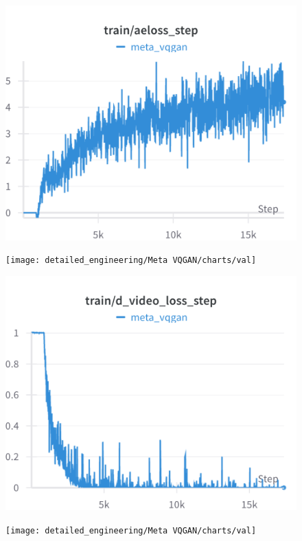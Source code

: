 \begin{figure}[H]
\includegraphics[width=\linewidth]{detailed_engineering/Meta VQGAN/charts/train_aeloss_step.png}
\caption{}
\endminipage\hfill
{}
\texttt{[image: detailed\_engineering/Meta VQGAN/charts/val]}
\caption{}
\endminipage
\end{figure}

\begin{figure}[H]
\includegraphics[width=\linewidth]{detailed_engineering/Meta VQGAN/charts/train_d_video_loss_step.png}
\caption{}
\endminipage\hfill
{}
\texttt{[image: detailed\_engineering/Meta VQGAN/charts/val]}
\caption{}
\endminipage
\end{figure}

